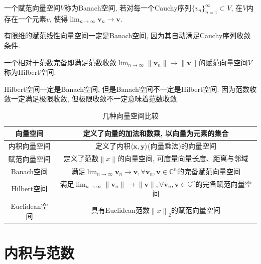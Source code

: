 \documentclass[lang=cn,10pt]{gorgeousnbook}
\numberwithin{equation}{section}%
\numberwithin{figure}{section}%
\begin{document}
\begin{definition}[Banach空间]
一个赋范向量空间$V$称为Banach空间, 若对每一个Cauchy序列$\{v_{n}\}_{n=1}^{\infty}\subset V$, 在$V$内存在一个元素$v$, 使得$\lim_{n\to\infty}\boldsymbol{v}_n\to\boldsymbol{v}$.
\end{definition}
有限维的赋范线性向量空间一定是Banach空间, 因为其自动满足Cauchy序列收敛条件. 

\begin{definition}[Hilbert空间]
一个相对于范数完备即满足范数收敛$\lim_{n\to\infty}\|\boldsymbol{v}_n\|\to\|\boldsymbol{v}\|$的赋范向量空间$V$称为Hilbert空间. 
\end{definition}
Hilbert空间一定是Banach空间, 但是Banach空间不一定是Hilbert空间. 因为范数收敛一定满足极限收敛, 但极限收敛不一定意味着范数收敛. 

\renewcommand\arraystretch{1.5}
\begin{table}
\caption{几种向量空间比较}
\centering
\begin{tabular}{c|c}
\toprule[2pt]
向量空间 &定义了向量的加法和数乘, 以向量为元素的集合  \\ \hline
内积向量空间 &定义了内积$\langle\boldsymbol{x},\boldsymbol{y}\rangle $(向量乘法)的向量空间  \\ \hline
赋范向量空间 &定义了范数$\left\|x\right\|$的向量空间, 可度量向量长度、距离与邻域  \\ \hline
Banach空间 &满足$\lim_{n\to\infty}\boldsymbol{v}_n\to\boldsymbol{v},\forall\boldsymbol{v}_n,\boldsymbol{v}\in\mathbb{C}^n$的完备赋范向量空间  \\ \hline
Hilbert空间  &满足$\lim_{n\to\infty}\lVert\boldsymbol{v}_n\rVert\to\lVert\boldsymbol{v}\rVert,\forall\boldsymbol{v}_n,\boldsymbol{v}\in\mathbb{C}^n$的完备赋范向量空间  \\ \hline
Euclidean空间 &具有Euclidean范数$\left\|x\right\|_2$的赋范向量空间  \\ 
\bottomrule[2pt]
\end{tabular}
\end{table}
\section{内积与范数}
\end{document}
